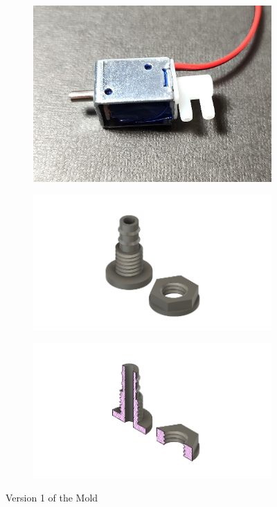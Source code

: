 \documentclass[twoside]{article}
\begin{document}
\begin{figure}[H]
	\begin{subfigure}[b]{0.33\linewidth}
		\centering
		\includegraphics[width=\textwidth]{solenoid valve}
	\end{subfigure}%
	\begin{subfigure}[b]{0.33\linewidth}
		\centering		
		\includegraphics[width=\textwidth]{valve}
	\end{subfigure}%
	\begin{subfigure}[b]{0.33\linewidth}
		\centering
		\includegraphics[width=\textwidth]{valve_section}
	\end{subfigure}%
	\caption{Version 1 of the Mold}
\end{figure}
\end{document}
